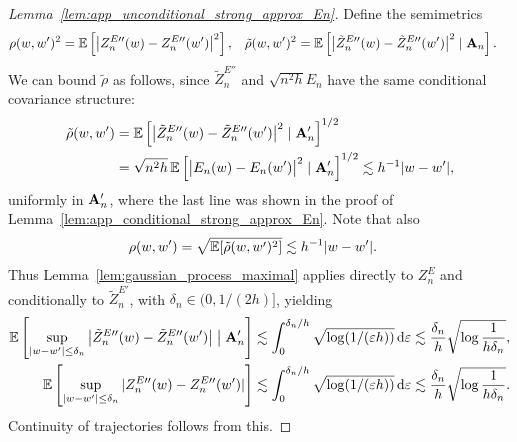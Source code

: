 \begin{proof}[Lemma~\ref{lem:app_unconditional_strong_approx_En}]

  Define the semimetrics
  \begin{align*}
    \rho(w, w')^2
    &=
    \mathbb{E}\left[
      \big|Z_n^{E\prime\prime}(w) - Z_n^{E\prime\prime}(w')\big|^2
    \right],
    &\tilde\rho(w, w')^2
    &=
    \mathbb{E}\left[
      \big|\tilde Z_n^{E\prime\prime}(w) - \tilde Z_n^{E\prime\prime}(w')\big|^2
      \mid \mathbf{A}_n
    \right].
  \end{align*}
  We can bound $\tilde \rho$ as follows,
  since $\tilde Z_n^{E\dprime}$ and $\sqrt{n^2h} E_n$
  have the same conditional covariance structure:
  \begin{align*}
    \tilde\rho(w, w')
    &=
    \mathbb{E}\left[
      \big|\tilde Z_n^{E\prime\prime}(w) - \tilde Z_n^{E\prime\prime}(w')\big|^2
      \mid \mathbf{A}_n'
    \right]^{1/2} \\
    &=
    \sqrt{n^2 h} \,
    \mathbb{E}\left[
      \big|E_n(w) - E_n(w')\big|^2
      \mid \mathbf{A}_n'
    \right]^{1/2}
    \lesssim
    h^{-1}
    |w-w'|,
  \end{align*}
  uniformly in $\mathbf{A}_n'$,
  where the last line was shown in
  the proof of Lemma~\ref{lem:app_conditional_strong_approx_En}.
  Note that also
  \begin{align*}
    \rho(w, w')
    &=
    \sqrt{\mathbb{E}[\tilde \rho(w,w')^2]}
    \lesssim
    h^{-1}
    |w-w'|.
  \end{align*}
  Thus Lemma~\ref{lem:gaussian_process_maximal}
  applies directly to $Z_n^E$
  and conditionally to $\tilde Z_n^{E\prime}$,
  with $\delta_n \in (0, 1/(2h)]$,
  yielding
  \begin{align*}
    \mathbb{E}\left[
      \sup_{|w-w'| \leq \delta_n}
      \big|\tilde Z_n^{E\prime\prime}(w) - \tilde Z_n^{E\prime\prime}(w')\big|
      \bigm\vert \mathbf{A}_n'
    \right]
    &\lesssim
    \int_0^{\delta_n / h}
    \sqrt{\log (1 / (\varepsilon h))}
    \,\mathrm{d}\varepsilon
    \lesssim
    \frac{\delta_n}{h}
    \sqrt{\log \frac{1}{h \delta_n}}, \\
    \mathbb{E}\left[
      \sup_{|w-w'| \leq \delta_n}
      |Z_n^{E\prime\prime}(w) - Z_n^{E\prime\prime}(w')|
    \right]
    &\lesssim
    \int_0^{\delta_n / h}
    \sqrt{\log (1 / (\varepsilon h))}
    \,\mathrm{d}\varepsilon
    \lesssim
    \frac{\delta_n}{h}
    \sqrt{\log \frac{1}{h \delta_n}}.
  \end{align*}
  Continuity of trajectories follows from this.



\end{proof}
